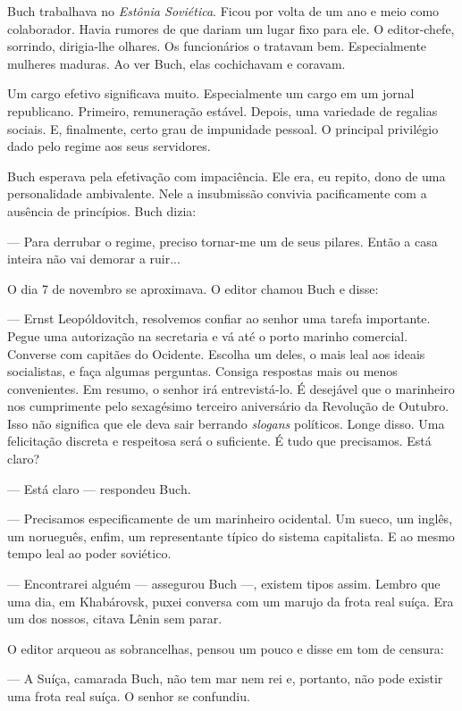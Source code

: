 Buch trabalhava no \emph{Estônia Soviética}. Ficou por volta de um ano e
meio como colaborador. Havia rumores de que dariam um lugar fixo para
ele. O editor-chefe, sorrindo, dirigia-lhe olhares. Os funcionários o
tratavam bem. Especialmente mulheres maduras. Ao ver Buch, elas
cochichavam e coravam.

Um cargo efetivo significava muito. Especialmente um cargo em um jornal
republicano. Primeiro, remuneração estável. Depois, uma variedade de
regalias sociais. E, finalmente, certo grau de impunidade pessoal. O
principal privilégio dado pelo regime aos seus servidores.

Buch esperava pela efetivação com impaciência. Ele era, eu repito, dono
de uma personalidade ambivalente. Nele a insubmissão convivia
pacificamente com a ausência de princípios. Buch dizia:

--- Para derrubar o regime, preciso tornar-me um de seus pilares. Então
a casa inteira não vai demorar a ruir...

O dia 7 de novembro se aproximava. O editor chamou Buch e disse:

--- Ernst Leopóldovitch, resolvemos confiar ao senhor uma tarefa
importante. Pegue uma autorização na secretaria e vá até o porto marinho
comercial. Converse com capitães do Ocidente. Escolha um deles, o mais
leal aos ideais socialistas, e faça algumas perguntas. Consiga respostas
mais ou menos convenientes. Em resumo, o senhor irá entrevistá-lo. É
desejável que o marinheiro nos cumprimente pelo sexagésimo terceiro
aniversário da Revolução de Outubro. Isso não significa que ele deva
sair berrando \emph{slogans} políticos. Longe disso. Uma felicitação
discreta e respeitosa será o suficiente. É tudo que precisamos. Está
claro?

--- Está claro --- respondeu Buch.

--- Precisamos especificamente de um marinheiro ocidental. Um sueco, um
inglês, um norueguês, enfim, um representante típico do sistema
capitalista. E ao mesmo tempo leal ao poder soviético.

--- Encontrarei alguém --- assegurou Buch ---, existem tipos assim.
Lembro que uma dia, em Khabárovsk, puxei conversa com um marujo da frota
real suíça. Era um dos nossos, citava Lênin sem parar.

O editor arqueou as sobrancelhas, pensou um pouco e disse em tom de
censura:

--- A Suíça, camarada Buch, não tem mar nem rei e, portanto, não pode
existir uma frota real suíça. O senhor se confundiu.


